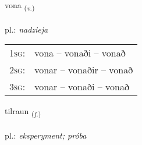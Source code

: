 \documentclass[frontgrid, backgrid]{flacards}\usepackage[]{graphicx}\usepackage[]{xcolor}
\begin{document}
\renewcommand{\flhead}{\vskip5pt \fboxsep=0pt {\small\bfseries\footnotesize Sagnorð | Verb}}
\renewcommand{\fcfoot}{\vskip5pt \fboxsep=0pt \hspace{2pt}{\small\bfseries\footnotesize 1K}}

\renewcommand{\blhead}{\vskip5pt {\small\bfseries\footnotesize Sagnorð | Verb }}
\renewcommand{\bcfoot}{\vskip5pt \hspace{2pt}{\small\bfseries\footnotesize 1K}}


{vona \small{\textsubscript{(\textit{v.})}} \\[1ex] %
\textphonetic{[vɔːna]} \\
pl.: \emph{nadzieja} \\  [2ex]
\renewcommand*{\arraystretch}{0.8}
\begin{tabular}{p{1cm}l}
\textsc{1sg}: & vona -- vonaði -- vonað \\ 
\textsc{2sg}: & vonar -- vonaðir -- vonað \\ 
\textsc{3sg}: & vonar -- vonaði -- vonað \\ 
\end{tabular}
}

\renewcommand{\flhead}{\vskip5pt \fboxsep=0pt {\small\bfseries\footnotesize Nafnorð | Noun}}
\renewcommand{\fcfoot}{\vskip5pt \fboxsep=0pt \hspace{2pt}{\small\bfseries\footnotesize 1K}}

\renewcommand{\blhead}{\vskip5pt {\small\bfseries\footnotesize Nafnorð | Noun }}
\renewcommand{\bcfoot}{\vskip5pt \hspace{2pt}{\small\bfseries\footnotesize 1K}}


{tilraun \small{\textsubscript{(\textit{f.})}} \\[1ex] %
\textphonetic{[tʰɪlrœin]} \\
pl.: \emph{eksperyment; próba} \\  [2ex]
\renewcommand*{\arraystretch}{0.8}
}
\end{document}
